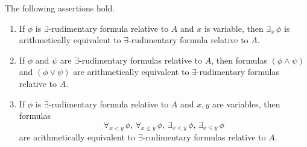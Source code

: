 \documentclass[10pt]{amsart}
\begin{document}
\begin{proposition}\label{proposition:extensional_properties_of_existential_rudimentary_formulas}
	The following assertions hold.
	\begin{enumerate}[label=\emph{\textbf{(\arabic*)}}, leftmargin=3.0em]
		\item If $\phi$ is $\exists$-rudimentary formula relative to $A$ and $x$ is variable, then $\exists_x\,\phi$ is arithmetically equivalent to $\exists$-rudimentary formula relative to $A$.
		\item If $\phi$ and $\psi$ are $\exists$-rudimentary formulas relative to $A$, then formulas $\left(\phi \wedge \psi\right)$ and $\left(\phi \vee \psi\right)$ are arithmetically equivalent to $\exists$-rudimentary formulas relative to $A$.
		\item If $\phi$ is $\exists$-rudimentary formula relative to $A$ and $x,y$ are variables, then formulas
		      $$\forall_{x < y}\,\phi,\,\forall_{x \leq y}\,\phi,\,\exists_{x < y}\,\phi,\,\exists_{x \leq y}\,\phi$$
		      are arithmetically equivalent to $\exists$-rudimentary formulas relative to $A$.
	\end{enumerate}
\end{proposition}
\end{document}
